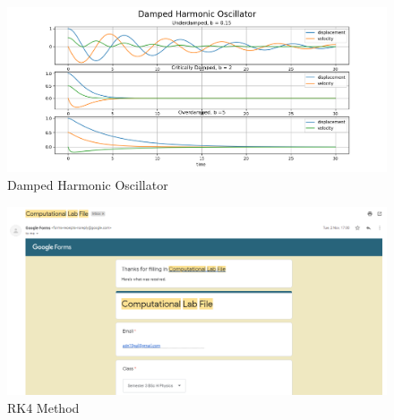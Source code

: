 \documentclass{article}
\begin{document}
\newpage
\begin{figure}[h]
    \centering
    \includegraphics[width=15cm,height=13cm \textwidth]{2nd_order_diff_using_rk2/Figure_2.png}
\caption{Damped Harmonic Oscillator}
\end{figure}

\clearpage
\begin{figure}[h]
    \centering
    \includegraphics[width=14cm,height=12cm \textwidth]{6.PNG}
\caption{RK4 Method}
\end{figure}
\end{document}
